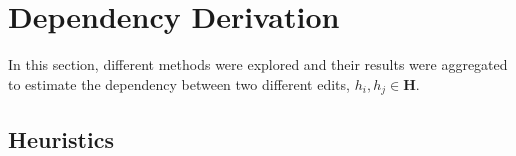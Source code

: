 



\section{Dependency Derivation}

In this section, different methods were explored and their results were aggregated to estimate the dependency between two different edits, $h_i, h_j \in \mathbf{H}$. 


\subsection{Heuristics}

